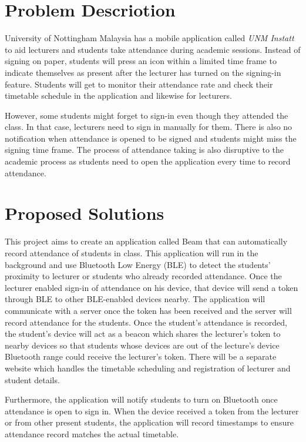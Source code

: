 \documentclass[../report.tex]{subfiles}
\begin{document}
\section{Problem Descriotion}
University of Nottingham Malaysia has a mobile application called \textit{UNM Instatt} to aid lecturers and students take attendance during academic sessions. Instead of signing on paper, students will press an icon within a limited time frame to indicate themselves as present after the lecturer has turned on the signing-in feature. Students will get to monitor their attendance rate and check their timetable schedule in the application and likewise for lecturers. 

However, some students might forget to sign-in even though they attended the class. In that case, lecturers need to sign in manually for them. There is also no notification when attendance is opened to be signed and students might miss the signing time frame. The process of attendance taking is also disruptive to the academic process as students need to open the application every time to record attendance.

\section{Proposed Solutions}
This project aims to create an application called Beam that can automatically record attendance of students in class. This application will run in the background and use Bluetooth Low Energy (BLE) to detect the students’ proximity to lecturer or students who already recorded attendance. Once the lecturer enabled sign-in of attendance on his device, that device will send a token through BLE to other BLE-enabled devices nearby. The application will communicate with a server once the token has been received and the server will record attendance for the students. Once the student’s attendance is recorded, the student’s device will act as a beacon which shares the lecturer’s token to nearby devices so that students whose devices are out of the lecture’s device Bluetooth range could receive the lecturer’s token.  There will be a separate website which handles the timetable scheduling and registration of lecturer and student details.  

Furthermore, the application will notify students to turn on Bluetooth once attendance is open to sign in. When the device received a token from the lecturer or from other present students, the application will record timestamps to ensure attendance record matches the actual timetable.
\end{document}
